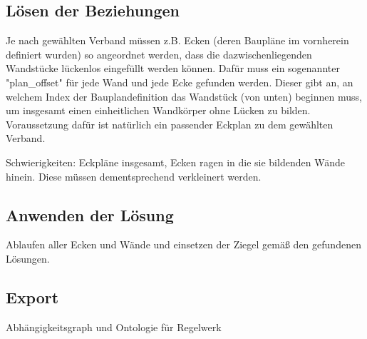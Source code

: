 \subsection{Lösen der Beziehungen}
Je nach gewählten Verband müssen z.B. Ecken (deren Baupläne im vornherein definiert wurden) so angeordnet werden, dass die dazwischenliegenden Wandstücke lückenlos eingefüllt werden können.
Dafür muss ein sogenannter "plan\_offset" für jede Wand und jede Ecke gefunden werden. Dieser gibt an, an welchem Index der Bauplandefinition das Wandstück (von unten) beginnen muss, um insgesamt einen einheitlichen Wandkörper ohne Lücken zu bilden.
Voraussetzung dafür ist natürlich ein passender Eckplan zu dem gewählten Verband. 

Schwierigkeiten: Eckpläne insgesamt, Ecken ragen in die sie bildenden Wände hinein. Diese müssen dementsprechend verkleinert werden.

\subsection{Anwenden der Lösung}
Ablaufen aller Ecken und Wände und einsetzen der Ziegel gemäß den gefundenen Lösungen.

\subsection{Export}
Abhängigkeitsgraph und Ontologie für Regelwerk